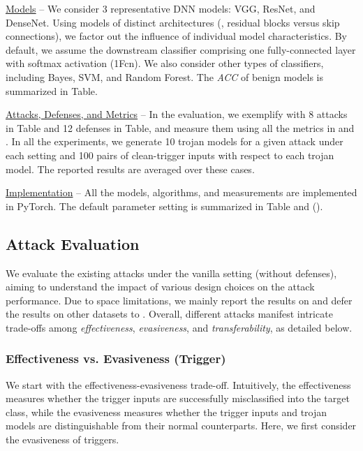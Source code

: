 \documentclass[compsoc,conference,a4paper,10pt,times]{IEEEtran}
\newcommand{\acc}{{\em \small ACC}\xspace}
\begin{document}
\vspace{1pt}
{\underline{Models} --} We consider 3 representative DNN models: VGG, ResNet, and DenseNet. Using models of distinct architectures (\meg, residual blocks versus skip connections), we factor out the influence of individual model characteristics. By default, we assume the downstream classifier comprising one fully-connected layer with softmax activation (1{\sc Fcn}). We also consider other types of classifiers, including Bayes, SVM, and Random Forest. The \acc of benign models is summarized in Table. 


\vspace{1pt}
{\underline{Attacks, Defenses, and Metrics} --} In the evaluation, we exemplify with 8 attacks in Table and 12 defenses in Table, and measure them using all the metrics in  and . In all the experiments, we generate 10 trojan models for a given attack under each setting and 100 pairs of clean-trigger inputs with respect to each trojan model. The reported results are averaged over these cases. 

\vspace{1pt}
{\underline{Implementation} --} All the models, algorithms, and measurements are implemented in PyTorch. The default parameter setting is summarized in Table and ().

\subsection{Attack Evaluation}
\label{sec:attack-eval}

We evaluate the existing attacks under the vanilla setting (without defenses), aiming to understand the impact of various design choices on the attack performance. Due to space limitations, we mainly report the results on \cifar and defer the results on other datasets to . Overall, different attacks manifest intricate trade-offs among {\em effectiveness}, {\em evasiveness}, and {\em transferability}, as detailed below.

\subsubsection{Effectiveness vs. Evasiveness (Trigger) }

We start with the effectiveness-evasiveness trade-off. Intuitively, the effectiveness measures whether the trigger inputs are successfully misclassified into the target class, while the evasiveness measures whether the trigger inputs and trojan models are distinguishable from their normal counterparts. Here, we first consider the evasiveness of triggers.
\end{document}
